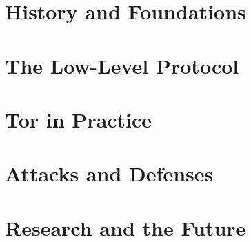\part{History and Foundations}




\part{The Low-Level Protocol}












\part{Tor in Practice}









\part{Attacks and Defenses}



\part{Research and the Future}



\appendix




